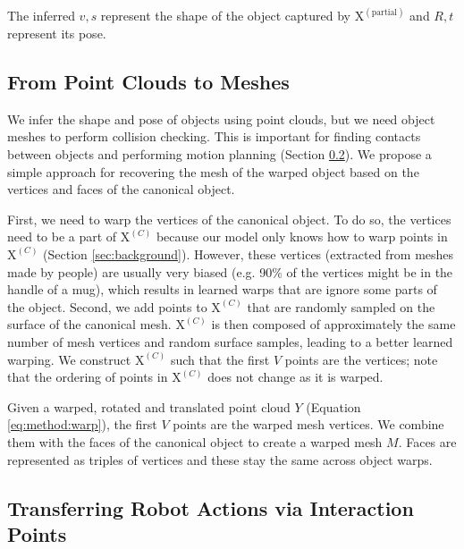 \documentclass{article}
\newcommand{\pcx}[1]{\mathrm{X}^{(#1)}}
\newcommand{\pcc}{\pcx{C}}
\begin{document}
The inferred $v, s$ represent the shape of the object captured by $\pcx{\mathrm{partial}}$ and $R, t$ represent its pose.

\subsection{From Point Clouds to Meshes}
\label{sec:methods:mesh}

We infer the shape and pose of objects using point clouds, but we need object meshes to perform collision checking. This is important for finding contacts between objects and performing motion planning (Section \ref{sec:methods:cloning}). We propose a simple approach for recovering the mesh of the warped object based on the vertices and faces of the canonical object.

First, we need to warp the vertices of the canonical object. To do so, the vertices need to be a part of $\pcc$ because our model only knows how to warp points in $\pcc$ (Section \ref{sec:background}). However, these vertices (extracted from meshes made by people) are usually very biased (e.g. 90\% of the vertices might be in the handle of a mug), which results in learned warps that are ignore some parts of the object. Second, we add points to $\pcc$ that are randomly sampled on the surface of the canonical mesh. $\pcc$ is then composed of approximately the same number of mesh vertices and random surface samples, leading to a better learned warping. We construct $\pcc$ such that the first $V$ points are the vertices; note that the ordering of points in $\pcc$ does not change as it is warped.

Given a warped, rotated and translated point cloud $Y$ (Equation \ref{eq:method:warp}), the first $V$ points are the warped mesh vertices. We combine them with the faces of the canonical object to create a warped mesh $M$. Faces are represented as triples of vertices and these stay the same across object warps.

\subsection{Transferring Robot Actions via Interaction Points}
\label{sec:methods:cloning}
\end{document}
